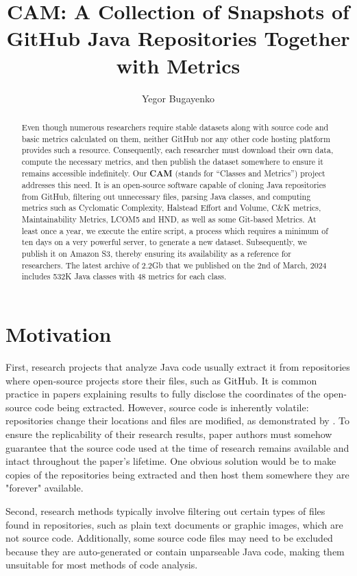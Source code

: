 \documentclass[11pt,sigplan,nonacm]{acmart}
\title{CAM: A Collection of Snapshots of GitHub Java Repositories Together with Metrics}
\author{Yegor Bugayenko}
\affiliation{\institution{Huawei, Russia, Moscow}\city{}\country{}}
\newcommand\cam{{\sffamily\bfseries CAM}}
\begin{document}
\begin{abstract}
Even though numerous researchers require stable datasets along with source code and basic metrics calculated on them, neither GitHub nor any other code hosting platform provides such a resource. Consequently, each researcher must download their own data, compute the necessary metrics, and then publish the dataset somewhere to ensure it remains accessible indefinitely. Our \cam{} (stands for ``Classes and Metrics'') project addresses this need. It is an open-source software capable of cloning Java repositories from GitHub, filtering out unnecessary files, parsing Java classes, and computing metrics such as Cyclomatic Complexity, Halstead Effort and Volume, C\&K metrics, Maintainability Metrics, LCOM5 and HND, as well as some Git-based Metrics. At least once a year, we execute the entire script, a process which requires a minimum of ten days on a very powerful server, to generate a new dataset. Subsequently, we publish it on Amazon S3, thereby ensuring its availability as a reference for researchers. The latest archive of 2.2Gb that we published on the 2nd of March, 2024 includes 532K Java classes with 48 metrics for each class.
\end{abstract}

\maketitle

\section{Motivation}

First, research projects that analyze Java code usually extract it from repositories where open-source projects store their files, such as GitHub. It is common practice in papers explaining results to fully disclose the coordinates of the open-source code being extracted. However, source code is inherently volatile: repositories change their locations and files are modified, as demonstrated by \citet{5463348}. To ensure the replicability of their research results, paper authors must somehow guarantee that the source code used at the time of research remains available and intact throughout the paper's lifetime. One obvious solution would be to make copies of the repositories being extracted and then host them somewhere they are "forever" available.

Second, research methods typically involve filtering out certain types of files found in repositories, such as plain text documents or graphic images, which are not source code. Additionally, some source code files may need to be excluded because they are auto-generated or contain unparseable Java code, making them unsuitable for most methods of code analysis.
\end{document}
